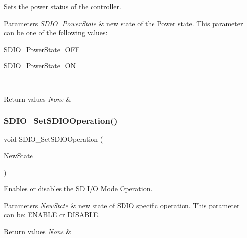 Sets the power status of the controller. 


\begin{DoxyParams}{Parameters}
{\em S\+D\+I\+O\+\_\+\+Power\+State} & new state of the Power state. This parameter can be one of the following values\+: \begin{DoxyItemize}
\item S\+D\+I\+O\+\_\+\+Power\+State\+\_\+\+O\+FF \item S\+D\+I\+O\+\_\+\+Power\+State\+\_\+\+ON \end{DoxyItemize}
\\
\hline
\end{DoxyParams}

\begin{DoxyRetVals}{Return values}
{\em None} & \\
\hline
\end{DoxyRetVals}
\mbox{\label{group___s_d_i_o___private___functions_ga24e210c185d5a7855cbaff4472a8f8d1}} 
\subsubsection{\texorpdfstring{SDIO\_SetSDIOOperation()}{SDIO\_SetSDIOOperation()}}
{\footnotesize\ttfamily void S\+D\+I\+O\+\_\+\+Set\+S\+D\+I\+O\+Operation (\begin{DoxyParamCaption}\item[{\mbox{\hyperlink{group___exported__types_gac9a7e9a35d2513ec15c3b537aaa4fba1}{Functional\+State}}}]{New\+State }\end{DoxyParamCaption})}



Enables or disables the SD I/O Mode Operation. 


\begin{DoxyParams}{Parameters}
{\em New\+State} & new state of S\+D\+IO specific operation. This parameter can be\+: E\+N\+A\+B\+LE or D\+I\+S\+A\+B\+LE. \\
\hline
\end{DoxyParams}

\begin{DoxyRetVals}{Return values}
{\em None} & \\
\hline
\end{DoxyRetVals}
\mbox{\label{group___s_d_i_o___private___functions_ga2baac4ea1bb6c2d94345d2712604338a}} 
